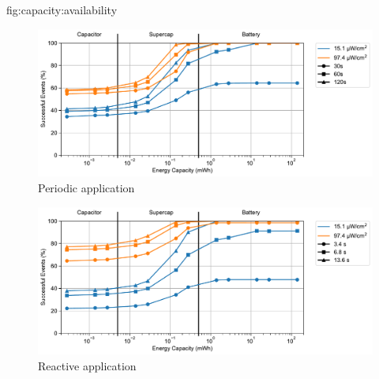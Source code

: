 \begin{definefigure*}{fig:capacity:availability}
  \centering
  \begin{subfigure}{\columnwidth}
    \centering
    \includegraphics[width=\linewidth]{figs/capacity/sense_and_send/usage_reliability_v_secondary_capacity/events_vs_secondary_size.pdf}
      \caption{Periodic application}
    \label{fig:capacity:availability:sensesec}
  \end{subfigure}
  \begin{subfigure}{\columnwidth}
    \centering
    \includegraphics[width=\linewidth]{figs/capacity/door_occupancy/events_vs_secondary_size}
    \caption{Reactive application}
    \label{fig:capacity:availability:eventsec}
  \end{subfigure}
  \caption{
    \normalfont
    Workload availability
    for different harvesting scenarios, workloads, and idealized secondary storage sizes.
    We define availability as the percentage of successfully completed events. If a periodic or random event occurs and the sensor does not have sufficient energy to complete the event, that event is not completed and is considered missed.
    As expected, workload availability follows a similar 
    trend as energy utilization, improving with increased secondary energy
    storage and energy capture. 
    For both periodic and reactive workloads, from the smallest to
    largest capacity simulated, we see a 1.4-2.7x improvement in availability.
    In cases where average harvester power is sufficient to power the workload completely, the sensor achieves 100\% availability on the workload when configured with sufficient capacity.
    }
\end{definefigure*}

